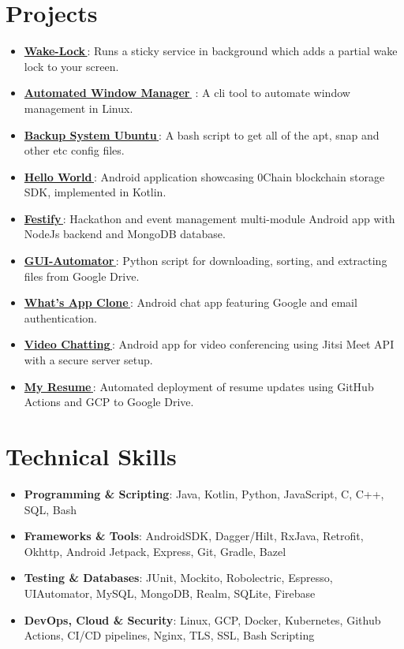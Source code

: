 \documentclass[letterpaper,1pt]{article}
\let\orighref\href
\renewcommand{\href}[2]{\orighref{#1}{#2\,\faExternalLink}}
\begin{document}
\section{Projects}
\begin{itemize}[leftmargin=*, itemsep=1pt, parsep=0pt]
  \item \href{https://github.com/yash10019coder/Wake-Lock}{\textbf{Wake-Lock}}: Runs a sticky service in background which adds a partial wake lock to your screen.
  \item \href{https://github.com/yash10019coder/AutomatedWindowManager}{\textbf{Automated Window Manager}} : A cli tool to automate window management in Linux.
  \item \href{https://github.com/yash10019coder/backup-system-ubuntu}{\textbf{Backup System Ubuntu}}: A bash script to get all of the apt, snap and other etc config files.
  \item \href{https://github.com/0chain/HelloWorld-Android}{\textbf{Hello World}}: Android application showcasing 0Chain blockchain storage SDK, implemented in Kotlin.
  \item \href{https://github.com/yash10019coder/festify-android}{\textbf{Festify}}: Hackathon and event management multi-module Android app with NodeJs backend and MongoDB database.
  \item \href{https://github.com/yash10019coder/Gui-Automator}{\textbf{GUI-Automator}}: Python script for downloading, sorting, and extracting files from Google Drive.
  \item \href{https://github.com/yash10019coder/Whats-App}{\textbf{What's App Clone}}: Android chat app featuring Google and email authentication.
  \item \href{https://github.com/yash10019coder/Video-Chatting}{\textbf{Video Chatting}}: Android app for video conferencing using Jitsi Meet API with a secure server setup.
  \item \href{https://github.com/yash10019coder/resume}{\textbf{My Resume}}: Automated deployment of resume updates using GitHub Actions and GCP to Google Drive.
\end{itemize}

%
\section{Technical Skills}
\begin{itemize}
  \setlength\itemsep{0em}
  \setlength\parsep{0em}
  \item \textbf{Programming \& Scripting}: Java, Kotlin, Python, JavaScript, C, C++, SQL, Bash
  \item \textbf{Frameworks \& Tools}: AndroidSDK, Dagger/Hilt, RxJava, Retrofit, Okhttp, Android Jetpack, Express, Git, Gradle, Bazel
  \item \textbf{Testing \& Databases}: JUnit, Mockito, Robolectric, Espresso, UIAutomator, MySQL, MongoDB, Realm, SQLite, Firebase
  \item \textbf{DevOps, Cloud \& Security}: Linux, GCP, Docker, Kubernetes, Github Actions, CI/CD pipelines, Nginx, TLS, SSL, Bash Scripting
\end{itemize}


\end{document}
